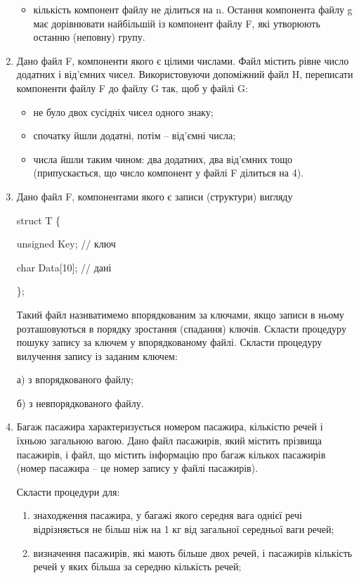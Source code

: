 \documentclass[]{article}
\makeatletter
\newcommand{\xslalph}[1]{\expandafter\@xslalph\csname c@#1\endcsname}
\newcommand{\@xslalph}[1]{%
    \ifcase#1\or а\or б\or в\or г\or д\or e\or є\or ж\or з\or i%
    \or й\or к\or л\or м\or н\or о\or п\or р\or с\or т%
    \or у\or ф\or х\or ц\or ч\or ш\or ю\or я\or аа\or бб\or вв %
    \else\@ctrerr\fi%
}
\makeatother
\begin{document}
\begin{enumerate}
\begin{itemize}
\item кількість компонент файлу не ділиться на n. Остання компонента файлу
g має дорівнювати найбільшій із компонент файлу F, які утворюють останню
(неповну) групу.
\end{itemize}
\item
Дано файл F, компоненти якого є цілими числами. Файл містить рівне число
додатних і від'ємних чисел. Використовуючи допоміжний файл H, переписати
компоненти файлу F до файлу G так, щоб у файлі G:
\begin{itemize}
\item не було двох сусідніх чисел одного знаку;

\item спочатку йшли додатні, потім -- від'ємні числа;
\item числа йшли таким чином: два додатних, два від'ємних тощо 
(припускається, що число компонент у файлі F ділиться на 4).
\end{itemize}

\item
Дано файл F, компонентами якого є записи (структури) вигляду

struct T \{

unsigned Key; // ключ

char Data{[}10{]}; // дані

\};

Такий файл називатимемо впорядкованим за ключами, якщо записи в ньому
розташовуються в порядку зростання (спадання) ключів. Скласти процедуру
пошуку запису за ключем у впорядкованому файлі. Скласти процедуру
вилучення запису із заданим ключем:

а) з впорядкованого файлу;

б) з невпорядкованого файлу.
\item
Багаж пасажира характеризується номером пасажира, кількістю речей і
їхньою загальною вагою. Дано файл пасажирів, який містить прізвища
пасажирів, і файл, що містить інформацію про багаж кількох пасажирів
(номер пасажира -- це номер запису у файлі пасажирів).

Скласти процедури для:
\begin{enumerate}[label=\xslalph*)]
\item
 знаходження пасажира, у багажі якого середня вага однієї речі 
відрізняється не більш ніж на 1 кг від загальної середньої ваги речей;

\item визначення пасажирів, які мають більше двох речей, і пасажирів
кількість речей у яких більша за середню кількість речей;


\end{enumerate}
\end{enumerate}
\end{document}
